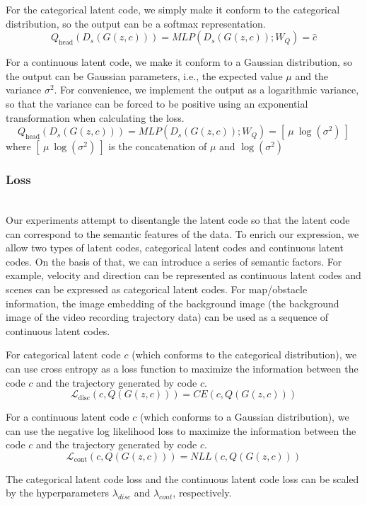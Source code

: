 For the categorical latent code, we simply make it conform to the categorical distribution, so the output can be a softmax representation.
$$Q_{\text{head}}(D_s(G(z, c))) = MLP(D_s(G(z, c)); W_{Q}) = \hat c$$

For a continuous latent code, we make it conform to a Gaussian distribution, so the output can be Gaussian parameters, i.e., the expected value $\mu$ and the variance $\sigma^2$. For convenience, we implement the output as a logarithmic variance, so that the variance can be forced to be positive using an exponential transformation when calculating the loss.
$$Q_{\text{head}}(D_s(G(z, c))) = MLP(D_s(G(z, c)); W_{Q}) = [\: \mu \: \log(\sigma^2) \: ]$$
where $[\: \mu \: \log(\sigma^2) \: ]$ is the concatenation of $\mu$ and $\log(\sigma^2)$


\subsubsection{Loss}
\hfill \\
Our experiments attempt to disentangle the latent code so that the latent code can correspond to the semantic features of the data. To enrich our expression, we allow two types of latent codes, categorical latent codes and continuous latent codes. On the basis of that, we can introduce a series of semantic factors. For example, velocity and direction can be represented as continuous latent codes and scenes can be expressed as categorical latent codes. For map/obstacle information, the image embedding of the background image (the background image of the video recording trajectory data) can be used as a sequence of continuous latent codes.

For categorical latent code $c$ (which conforms to the categorical distribution), we can use cross entropy as a loss function to maximize the information between the code $c$ and the trajectory generated by code $c$.
$$\mathcal{L}_{\text{disc}} (c, Q(G(z, c))) = CE(c, Q(G(z, c))) $$

For a continuous latent code $c$ (which conforms to a Gaussian distribution), we can use the negative log likelihood loss to maximize the information between the code $c$ and the trajectory generated by code $c$.
$$\mathcal{L}_{\text{cont}} (c, Q(G(z, c))) = NLL(c, Q(G(z, c))) $$

The categorical latent code loss and the continuous latent code loss can be scaled by the hyperparameters $\lambda_{disc}$ and $\lambda_{cont}$, respectively.

